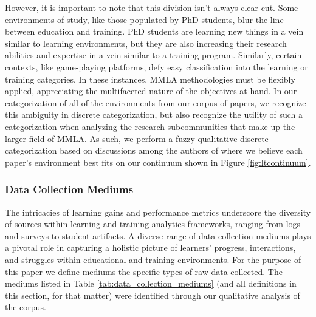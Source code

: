 \documentclass[manuscript,screen,review]{acmart}
\begin{document}
However, it is important to note that this division isn't always clear-cut. Some environments of study, like those populated by PhD students, blur the line between education and training. PhD students are learning new things in a vein similar to learning environments, but they are also increasing their research abilities and expertise in a vein similar to a training program. Similarly, certain contexts, like game-playing platforms, defy easy classification into the learning or training categories. In these instances, MMLA methodologies must be flexibly applied, appreciating the multifaceted nature of the objectives at hand. In our categorization of all of the environments from our corpus of papers, we recognize this ambiguity in discrete categorization, but also recognize the utility of such a categorization when analyzing the research subcommunities that make up the larger field of MMLA. As such, we perform a fuzzy qualitative discrete categorization based on discussions among the authors of where we believe each paper’s environment best fits on our continuum shown in Figure \ref{fig:ltcontinuum}.

\subsubsection{Data Collection Mediums} \label{subsec:data_collection_mediums}

The intricacies of learning gains and performance metrics underscore the diversity of sources within learning and training analytics frameworks, ranging from logs and surveys to student artifacts. A diverse range of data collection mediums plays a pivotal role in capturing a holistic picture of learners' progress, interactions, and struggles within educational and training environments. For the purpose of this paper we define mediums the specific types of raw data collected. The mediums listed in Table \ref{tab:data_collection_mediums} (and all definitions in this section, for that matter) were identified through our qualitative analysis of the corpus.
\end{document}

